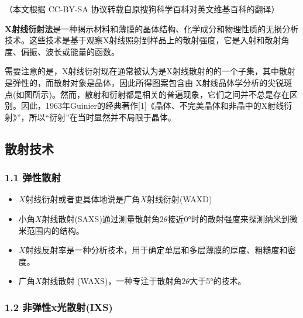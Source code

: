 
（本文根据 CC-BY-SA 协议转载自原搜狗科学百科对英文维基百科的翻译）

\textbf{X射线衍射法}是一种揭示材料和薄膜的晶体结构、化学成分和物理性质的无损分析技术。这些技术是基于观察X射线照射到样品上的散射强度，它是入射和散射角度、偏振、波长或能量的函数。

需要注意的是，X射线衍射现在通常被认为是X射线散射的的一个子集，其中散射是弹性的，而散射对象是晶体，因此所得图案包含由 X射线晶体学分析的尖锐斑点(如图所示)。然而，散射和衍射都是相关的普遍现象，它们之间并不总是存在区别。因此，1963年Guinier的经典著作[1]《晶体、不完美晶体和非晶中的X射线衍射》”，所以“衍射”在当时显然并不局限于晶体。

\subsection{散射技术}
\subsubsection{1.1 弹性散射}
\begin{itemize}
\item $X$射线衍射或者更具体地说是广角$X$射线衍射(WAXD)
\item 小角$X$射线散射(SAXS)通过测量散射角$2\theta$接近0°时的散射强度来探测纳米到微米范围内的结构。
\item $X$射线反射率是一种分析技术，用于确定单层和多层薄膜的厚度、粗糙度和密度。
\item 广角$X$射线散射 (WAXS)，一种专注于散射角$2\theta$大于5°的技术。
\end{itemize}
\subsubsection{1.2 非弹性x光散射(IXS)}